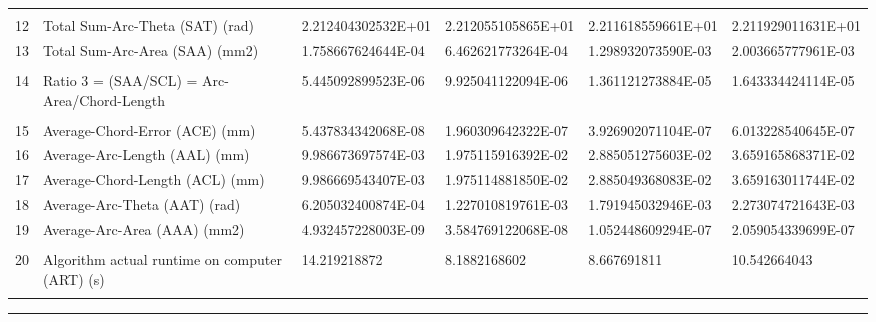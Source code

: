 \begin{landscape}
\begin{table}[ht]
{\begin{tabular}{ p{0.2cm} p{8.80cm} p{4.00cm} p{4.0cm} p{4.00cm} p{4.0cm}}
&		&		&		&		&		\\
12	&	Total Sum-Arc-Theta (SAT) (rad)	&	2.212404302532E+01	&	2.212055105865E+01	&	2.211618559661E+01	&	2.211929011631E+01	\\
13	&	Total Sum-Arc-Area (SAA) (mm2)	&	1.758667624644E-04	&	6.462621773264E-04	&	1.298932073590E-03	&	2.003665777961E-03	\\
&		&		&		&		&		\\
14	&	Ratio 3 = (SAA/SCL) = Arc-Area/Chord-Length	&	5.445092899523E-06	&	9.925041122094E-06	&	1.361121273884E-05	&	1.643334424114E-05	\\
&		&		&		&		&		\\
15	&	Average-Chord-Error (ACE) (mm)	&	5.437834342068E-08	&	1.960309642322E-07	&	3.926902071104E-07	&	6.013228540645E-07	\\
16	&	Average-Arc-Length (AAL) (mm)	&	9.986673697574E-03	&	1.975115916392E-02	&	2.885051275603E-02	&	3.659165868371E-02	\\
17	&	Average-Chord-Length (ACL) (mm)	&	9.986669543407E-03	&	1.975114881850E-02	&	2.885049368083E-02	&	3.659163011744E-02	\\
18	&	Average-Arc-Theta (AAT) (rad)	&	6.205032400874E-04	&	1.227010819761E-03	&	1.791945032946E-03	&	2.273074721643E-03	\\
19	&	Average-Arc-Area (AAA) (mm2)	&	4.932457228003E-09	&	3.584769122068E-08	&	1.052448609294E-07	&	2.059054339699E-07	\\
&		&		&		&		&		\\
20	&	Algorithm actual runtime on computer (ART) (s) 	&	14.219218872	&	8.1882168602	&	8.667691811	&	10.542664043	\\
&		&		&		&		&		

\end{tabular}
			
}   %
\hrule
\end{table}
\end{landscape}

